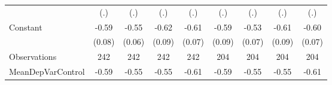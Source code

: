 {\begin{tabular}{l*{8}{c}}
                    &         (.)         &         (.)         &         (.)         &         (.)         &         (.)         &         (.)         &         (.)         &         (.)         \\
[1em]
Constant            &       -0.59\sym{***}&       -0.55\sym{***}&       -0.62\sym{***}&       -0.61\sym{***}&       -0.59\sym{***}&       -0.53\sym{***}&       -0.61\sym{***}&       -0.60\sym{***}\\
                    &      (0.08)         &      (0.06)         &      (0.09)         &      (0.07)         &      (0.09)         &      (0.07)         &      (0.09)         &      (0.07)         \\
\hline
Observations        &         242         &         242         &         242         &         242         &         204         &         204         &         204         &         204         \\
MeanDepVarControl   &       -0.59         &       -0.55         &       -0.55         &       -0.61         &       -0.59         &       -0.55         &       -0.55         &       -0.61         \\
\hline\hline
\end{tabular}
}
